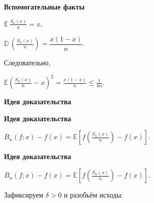 \documentclass[11pt]{article}
\begin{document}
\begin{center}
{\color{notaeYELLOW}\bfseries\fontsize{44}{52}\selectfont Вспомогательные факты}
\end{center}
\vspace*{\fill}
\begin{center}
\fontsize{36}{43}\selectfont
$\mathbb{E}\, \frac{S_n(x)}{n} = x,$\par\vspace{0.4in}
$\mathbb{D}\, \left(\frac{S_n(x)}{n}\right)= \dfrac{x(1-x)}{n}$. \par\vspace{0.4in}
Следовательно,\par\vspace{0.4in}
$\mathbb{E}\left(\frac{S_n(x)}{n} - x\right)^2 = \frac{x(1-x)}{n} \leqslant \frac{1}{4n}.$\par\vspace{0.4in}
\end{center}
\vspace*{\fill}

\newpage

\begin{center}
{\color{notaeYELLOW}\bfseries\fontsize{44}{52}\selectfont Идея доказательства}
\end{center}
\vspace*{\fill}
\begin{center}
\fontsize{36}{43}\selectfont
\end{center}
\vspace*{\fill}

\newpage

\begin{center}
{\color{notaeYELLOW}\bfseries\fontsize{44}{52}\selectfont Идея доказательства}
\end{center}
\vspace*{\fill}
\begin{center}
\fontsize{36}{43}\selectfont
$B_n(f;x) - f(x) = \mathbb{E}\left[ f\!\left(\frac{S_n(x)}{n}\right) - f(x) \right].$\par\vspace{0.4in}
\end{center}
\vspace*{\fill}

\newpage

\begin{center}
{\color{notaeYELLOW}\bfseries\fontsize{44}{52}\selectfont Идея доказательства}
\end{center}
\vspace*{\fill}
\begin{center}
\fontsize{36}{43}\selectfont
$B_n(f;x) - f(x) = \mathbb{E}\left[ f\!\left(\frac{S_n(x)}{n}\right) - f(x) \right].$\par\vspace{0.4in}
Зафиксируем $\delta>0$ и разобьём исходы:\par\vspace{0.4in}
\end{center}
\vspace*{\fill}
\end{document}
